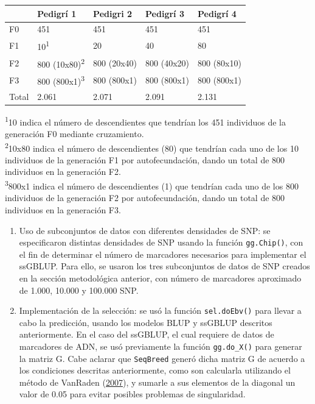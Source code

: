 \documentclass[11pt,spanish,a4paper,oneside,]{book} %
\begin{document}
\captionsetup[table]{labelformat=empty,skip=1pt}
\begin{longtable}{lllll}
\toprule
  & Pedigrí 1 & Pedigri 2 & Pedigrí 3 & Pedigrí 4 \\ 
\midrule
F0 & 451 & 451 & 451 & 451 \\ 
F1 & 10\textsuperscript{1} & 20 & 40 & 80 \\ 
F2 & 800 (10x80)\textsuperscript{2} & 800 (20x40) & 800 (40x20) & 800 (80x10) \\ 
F3 & 800 (800x1)\textsuperscript{3} & 800 (800x1) & 800 (800x1) & 800 (800x1) \\ 
Total & 2.061 & 2.071 & 2.091 & 2.131 \\ 
 \bottomrule
\end{longtable}
\vspace{-5mm}
\begin{minipage}{\linewidth}
\textsuperscript{1}10 indica el número de descendientes que tendrían los 451 individuos de la generación F0 mediante cruzamiento. \\ 
\textsuperscript{2}10x80 indica el número de descendientes (80) que tendrían cada uno de los 10 individuos de la generación F1 por autofecundación, dando un total de 800 individuos en la generación F2. \\ 
\textsuperscript{3}800x1 indica el número de descendientes (1) que tendrían cada uno de los 800 individuos de la generación F2 por autofecundación, dando un total de 800 individuos en la generación F3. \\ 
\end{minipage}

\begin{enumerate}
\def\labelenumi{\arabic{enumi}.}
\setcounter{enumi}{3}
\item
  Uso de subconjuntos de datos con diferentes densidades de SNP: se especificaron distintas densidades de SNP usando la función \texttt{gg.Chip()}, con el fin de determinar el número de marcadores necesarios para implementar el ssGBLUP. Para ello, se usaron los tres subconjuntos de datos de SNP creados en la sección metodológica anterior, con número de marcadores aproximado de 1.000, 10.000 y 100.000 SNP.
\item
  Implementación de la selección: se usó la función \texttt{sel.doEbv()} para llevar a cabo la predicción, usando los modelos BLUP y ssGBLUP descritos anteriormente. En el caso del ssGBLUP, el cual requiere de datos de marcadores de ADN, se usó previamente la función \texttt{gg.do\_X()} para generar la matriz G. Cabe aclarar que \texttt{SeqBreed} generó dicha matriz G de acuerdo a los condiciones descritas anteriormente, como son calcularla utilizando el método de VanRaden (\protect\hyperlink{ref-cite:39}{2007}), y sumarle a sus elementos de la diagonal un valor de 0.05 para evitar posibles problemas de singularidad.
\end{enumerate}
\end{document}
